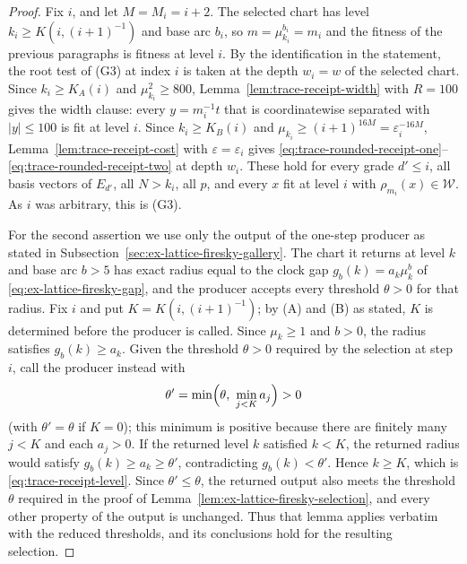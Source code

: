 \begin{proof}
Fix $i$, and let $M=M_i=i+2$. The selected chart has level
$k_i\ge K(i,(i+1)^{-1})$ and base arc $b_i$, so
$m=\mu_{k_i}^{b_i}=m_i$ and the fitness of the previous paragraphs is
fitness at level $i$. By the identification in the statement, the root
test of (G3) at index $i$ is taken at the depth $w_i=w$ of the selected
chart. Since $k_i\ge K_A(i)$ and $\mu_{k_i}^2\ge800$,
Lemma~\ref{lem:trace-receipt-width} with $R=100$ gives the width clause:
every $y=m_i^{-1}t$ that is coordinatewise separated with $|y|\le100$ is
fit at level $i$. Since $k_i\ge K_B(i)$ and
$\mu_{k_i}\ge(i+1)^{16M}=\varepsilon_i^{-16M}$,
Lemma~\ref{lem:trace-receipt-cost} with $\varepsilon=\varepsilon_i$ gives
\eqref{eq:trace-rounded-receipt-one}--\eqref{eq:trace-rounded-receipt-two}
at depth $w_i$. These hold for every grade $d'\le i$, all basis vectors
of $E_{d'}$, all $N>k_i$, all $p$, and every $x$ fit at level $i$ with
$\rho_{m_i}(x)\in\mathcal W$. As $i$ was arbitrary, this is (G3).

For the second assertion we use only the output of the one-step producer
as stated in Subsection~\ref{sec:ex-lattice-firesky-gallery}. The chart it
returns at level $k$ and base arc $b>5$ has exact radius equal to the
clock gap $g_b(k)=a_k\mu_k^b$ of \eqref{eq:ex-lattice-firesky-gap}, and the
producer accepts every threshold $\theta>0$ for that radius. Fix $i$ and
put $K=K(i,(i+1)^{-1})$; by (A) and (B) as stated, $K$ is determined
before the producer is called. Since $\mu_k\ge1$ and $b>0$, the radius
satisfies $g_b(k)\ge a_k$. Given the threshold $\theta>0$ required by the
selection at step $i$, call the producer instead with
\[
 \theta'=\min\Bigl(\theta,\ \min_{j<K}a_j\Bigr)>0
\]
(with $\theta'=\theta$ if $K=0$); this minimum is positive because
there are finitely many $j<K$ and each $a_j>0$. If the returned level $k$
satisfied $k<K$, the returned radius would satisfy
$g_b(k)\ge a_k\ge\theta'$, contradicting $g_b(k)<\theta'$. Hence
$k\ge K$, which is \eqref{eq:trace-receipt-level}. Since
$\theta'\le\theta$, the returned output also meets the threshold $\theta$
required in the proof of Lemma~\ref{lem:ex-lattice-firesky-selection},
and every other property of the output is unchanged. Thus that lemma
applies verbatim with the reduced thresholds, and its conclusions hold
for the resulting selection.
\end{proof}


